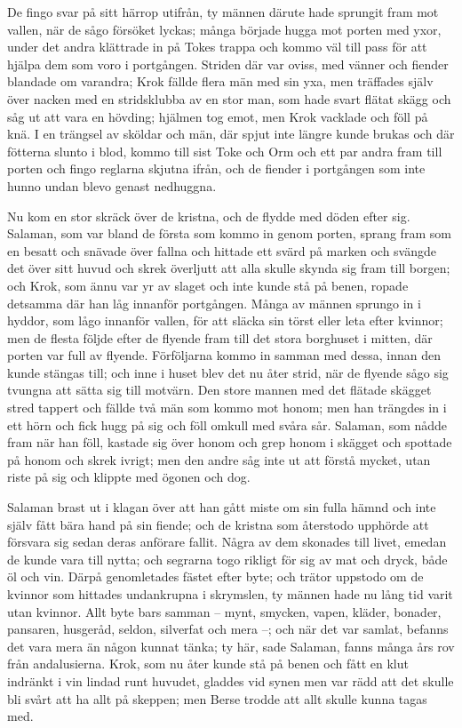 \initial De fingo svar på sitt härrop utifrån, ty männen därute hade sprungit fram mot vallen, när de sågo försöket lyckas; många började hugga mot porten med yxor, under det andra klättrade in på Tokes trappa och kommo väl till pass för att hjälpa dem som voro i portgången. Striden där var oviss, med vänner och fiender blandade om varandra; Krok fällde flera män med sin yxa, men träffades själv över nacken med en stridsklubba av en stor man, som hade svart flätat skägg och såg ut att vara en hövding; hjälmen tog emot, men Krok vacklade och föll på knä. I en trängsel av sköldar och män, där spjut inte längre kunde brukas och där fötterna slunto i blod, kommo till sist Toke och Orm och ett par andra fram till porten och fingo reglarna skjutna ifrån, och de fiender i portgången som inte hunno undan blevo genast nedhuggna.

\initial Nu kom en stor skräck över de kristna, och de flydde med döden efter sig. Salaman, som var bland de första som kommo in genom porten, sprang fram som en besatt och snävade över fallna och hittade ett svärd på marken och svängde det över sitt huvud och skrek överljutt att alla skulle skynda sig fram till borgen; och Krok, som ännu var yr av slaget och inte kunde stå på benen, ropade detsamma där han låg innanför portgången. Många av männen sprungo in i hyddor, som lågo innanför vallen, för att släcka sin törst eller leta efter kvinnor; men de flesta följde efter de flyende fram till det stora borghuset i mitten, där porten var full av flyende. Förföljarna kommo in samman med dessa, innan den kunde stängas till; och inne i huset blev det nu åter strid, när de flyende sågo sig tvungna att sätta sig till motvärn. Den store mannen med det flätade skägget stred tappert och fällde två män som kommo mot honom; men han trängdes in i ett hörn och fick hugg på sig och föll omkull med svåra sår. Salaman, som nådde fram när han föll, kastade sig över honom och grep honom i skägget och spottade på honom och skrek ivrigt; men den andre såg inte ut att förstå mycket, utan riste på sig och klippte med ögonen och dog.

\initial Salaman brast ut i klagan över att han gått miste om sin fulla hämnd och inte själv fått bära hand på sin fiende; och de kristna som återstodo upphörde att försvara sig sedan deras anförare fallit. Några av dem skonades till livet, emedan de kunde vara till nytta; och segrarna togo rikligt för sig av mat och dryck, både öl och vin. Därpå genomletades fästet efter byte; och trätor uppstodo om de kvinnor som hittades undankrupna i skrymslen, ty männen hade nu lång tid varit utan kvinnor. Allt byte bars samman – mynt, smycken, vapen, kläder, bonader, pansaren, husgeråd, seldon, silverfat och mera –; och när det var samlat, befanns det vara mera än någon kunnat tänka; ty här, sade Salaman, fanns många års rov från andalusierna. Krok, som nu åter kunde stå på benen och fått en klut indränkt i vin lindad runt huvudet, gladdes vid synen men var rädd att det skulle bli svårt att ha allt på skeppen; men Berse trodde att allt skulle kunna tagas med.

